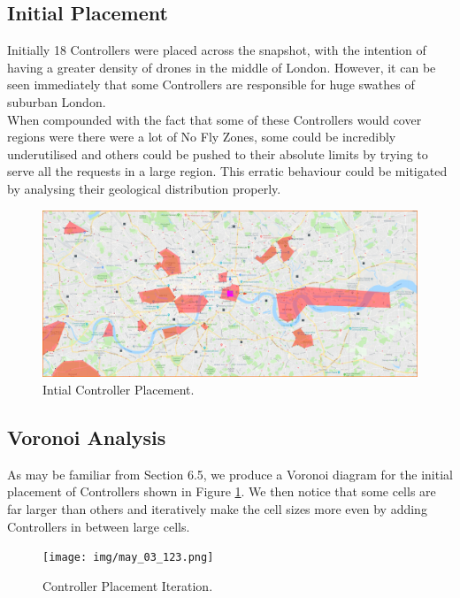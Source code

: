 \documentclass[a4paper,11pt,titlepage]{report}
\begin{document}
\clearpage
\subsection{Initial Placement}
Initially 18 Controllers were placed across the snapshot, with the intention of having a greater density of drones in the middle of London. However, it can be seen immediately that some Controllers are responsible for huge swathes of suburban London.\\

When compounded with the fact that some of these Controllers would cover regions were there were a lot of No Fly Zones, some could be incredibly underutilised and others could be pushed to their absolute limits by trying to serve all the requests in a large region. This erratic behaviour could be mitigated by analysing their geological distribution properly.

\begin{figure}[!hbpt]
  \center
  \includegraphics[width=\linewidth]{img/may_03_OG.png}
  \caption{Intial Controller Placement.}
  \label{fig:may_03_OG}
\end{figure}

\subsection{Voronoi Analysis}
As may be familiar from Section 6.5, we produce a Voronoi diagram for the initial placement of Controllers shown in Figure \ref{fig:may_03_OG}. We then notice that some cells are far larger than others and iteratively make the cell sizes more even by adding Controllers in between large cells.

\begin{figure}[!hbpt]
  \center
  \texttt{[image: img/may\_03\_123.png]}
  \caption{Controller Placement Iteration.}
  \label{fig:may_03_123}
\end{figure}
\end{document}
